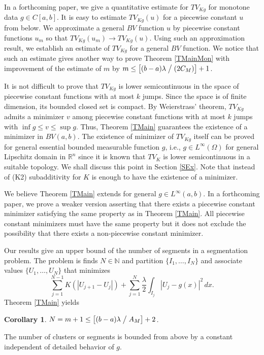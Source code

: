 \documentclass[11pt]{amsart} %
\numberwithin{equation}{section}
\newtheorem{cor}[thm]{Corollary}
\begin{document}
In a forthcoming paper, we give a quantitative estimate for $TV_{Kg}$ for monotone data $g\in C[a,b]$.
 It is easy to estimate $TV_{Kg}(u)$ for a piecewise constant $u$ from below.
 We approximate a general $BV$ function $u$ by piecewise constant functions $u_m$ so that $TV_{Kg}(u_m)\to TV_{Kg}(u)$.
 Using such an approximation result, we establish an estimate of $TV_{Kg}$ for a general $BV$ function.
 We notice that such an estimate gives another way to prove Theorem \ref{TMainMon} with improvement of the estimate of $m$ by $m\le\left[(b-a)\lambda\bigm/(2C_M)\right]+1$.

It is not difficult to prove that $TV_{Kg}$ is lower semicontinuous in the space of piecewise constant functions with at most $k$ jumps.
 Since the space is of finite dimension, its bounded closed set is compact.
 By Weierstrass' theorem, $TV_{Kg}$ admits a minimizer $v$ among piecewise constant functions with at most $k$ jumps with $\inf g\leq v\leq\sup g$.
 Thus, Theorem \ref{TMain} guarantees the existence of a minimizer in $BV(a,b)$.
 The existence of minimizer of $TV_{Kg}$ itself can be proved for general essential bounded measurable function $g$, i.e., $g\in L^\infty(\Omega)$ for general Lipschitz domain in $\mathbb{R}^n$ since it is known \cite{AFP} that $TV_K$ is lower semicontinuous in a suitable topology.
 We shall discuss this point in Section \ref{SEx}.
 Note that instead of (K2) subadditivity for $K$ is enough to have the existence of a minimizer.

We believe Theorem \ref{TMain} extends for general $g\in L^\infty(a,b)$.
 In a forthcoming paper, we prove a weaker version asserting that there exists a piecewise constant minimizer satisfying the same property as in Theorem \ref{TMain}.
 All piecewise constant minimizers must have the same property but it does not exclude the possibility that there exists a non-piecewise constant minimizer.

Our results give an upper bound of the number of segments in a segmentation problem.
 The problem is finds $N\in\mathbb{N}$ and partition $\{I_1,\ldots,I_N\}$ and associate values $\{U_1,\ldots,U_N\}$ that minimizes
\[
	\sum_{j=1}^{N-1} K \left( |U_{j+1} - U_j| \right)
	+ \sum_{j=1}^N \frac\lambda2 \int_{I_j} \left|U_j - g(x) \right|^2\,dx.
\]
Theorem \ref{TMain} yields
\begin{cor} \label{CInt}
$N=m+1\le\left[(b-a)\lambda\bigm/A_M\right]+2$.
\end{cor}
The number of clusters or segments is bounded from above by a constant independent of detailed behavior of $g$.
\end{document}
